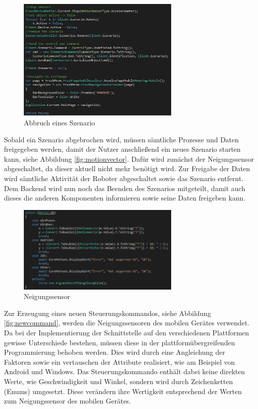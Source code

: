 \begin{figure}[h]
	\begin{center}
		\includegraphics[width=0.7\textwidth]{images/implementation/cancelszenario.png}
	\end{center}	
	\caption{Abbruch eines Szenario}
	\label{fig:cancelszenario}
\end{figure}

\noindent
Sobald ein Szenario abgebrochen wird, müssen sämtliche Prozesse und Daten freigegeben werden, damit der Nutzer anschließend ein neues Szenario starten kann, siehe Abbildung \eqref{fig:motionvector}. Dafür wird zunächst der Neigungssensor abgeschaltet, da dieser aktuell nicht mehr benötigt wird. Zur Freigabe der Daten wird sämtliche Aktivität der Roboter abgeschaltet sowie das Szenario entfernt. Dem Backend wird nun noch das Beenden des Szenarios mitgeteilt, damit auch dieses die anderen Komponenten informieren sowie seine Daten freigeben kann.

\begin{figure}[h]
	\begin{center}
		\includegraphics[width=0.7\textwidth]{images/implementation/motionvector.png}
	\end{center}	
	\caption{Neigungssensor}
	\label{fig:motionvector}
\end{figure}

\noindent
Zur Erzeugung eines neuen Steuerungskommandos, siehe Abbildung \eqref{fig:newcommand}, werden die Neigungssensoren des mobilen Gerätes verwendet. Da bei der Implementierung der Schnittstelle auf den verschiedenen Plattformen gewisse Unterschiede bestehen, müssen diese in der plattformübergreifenden Programmierung behoben werden. Dies wird durch eine Angleichung der Faktoren sowie ein vertauschen der Attribute realisiert, wie am Beispiel von Android und Windows. Das Steuerungskommando enthält dabei keine direkten Werte, wie Geschwindigkeit und Winkel, sondern wird durch Zeichenketten (Enums) umgesetzt. Diese verändern ihre Wertigkeit entsprechend der Werten zum Neigungssensor des mobilen Gerätes.


